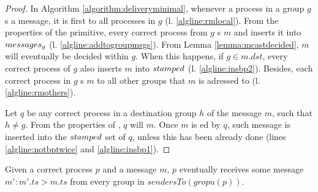 \documentclass[times, 10pt]{article}
\begin{document}
\begin{proof}
In Algorithm \ref{algorithm:deliveryminimal}, whenever a process in a group $g$ \amcast{}s a message, it is first \rmcast{} to all processes in $g$ (l. \ref{algline:rmlocal}). From the properties of the \rmcast{} primitive, every correct process from $g$ \rmdel{}s $m$ and inserts it into $messages\text{$_g$}$ (l. \ref{algline:addtogroupmsgs}). From Lemma \ref{lemma:mcastdecided}, $m$ will eventually be decided within $g$. When this happens, if $g \in m.dst$, every correct process of $g$ also inserts $m$ into $stamped$ (l. \ref{algline:insbp2}). Besides, each correct process in $g$ \rmcast{}s $m$ to all other groups that $m$ is adressed to (l. \ref{algline:rmothers}).

Let $q$ be any correct process in a destination group $h$ of the message $m$, such that $h \neq g$. From the properties of \rmcast{}, $q$ will \rmdel{} $m$. Once $m$ is \rmdel{}ed by $q$, such message is inserted into the $stamped$ set of $q$, unless this has been already done (lines \ref{algline:notbptwice} and \ref{algline:insbp1}).
\end{proof}



\begin{lems} \label{lemma:barrierperiodic}
  Given a correct process $p$ and a message $m$, $p$ eventually receives some message $m' : m'.ts > m.ts$ from every group in $sendersTo(gropu(p))$.%
\end{lems}
\end{document}
